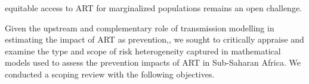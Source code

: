 equitable access to ART for marginalized populations remains an open challenge.
\par
Given the upstream and complementary role of transmission modelling
in estimating the impact of ART as prevention,\cite{Eaton2012,Delva2012},
we sought to critically appraise and examine the type and scope of risk heterogeneity captured
in mathematical models used to assess the prevention impacts of ART in Sub-Saharan Africa.
We conducted a scoping review with the following objectives.
